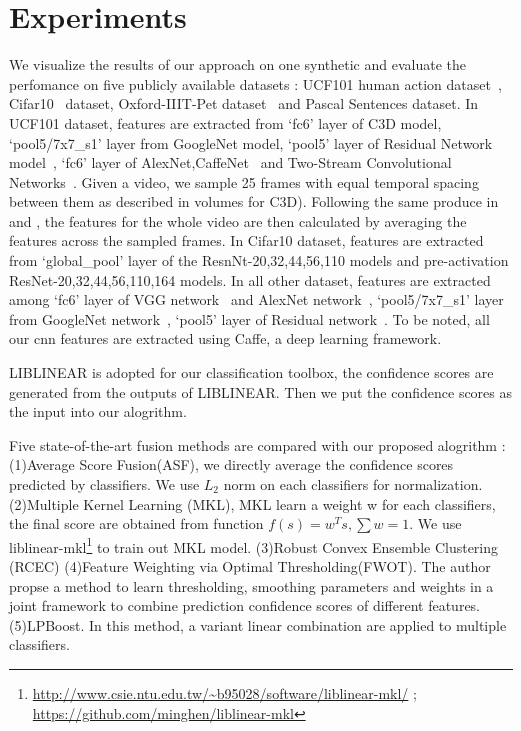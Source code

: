 \documentclass[letterpaper]{article}
\begin{document}
\section{Experiments}
We visualize the results of our approach on one synthetic and evaluate the perfomance on five publicly available datasets : UCF101 human action dataset~\cite{soomro2012ucf101}, Cifar10~\cite{krizhevsky2009learning} dataset, Oxford-IIIT-Pet dataset~\cite{parkhi12a} and Pascal Sentences dataset.
In UCF101 dataset, features are extracted from `fc6' layer of C3D model\cite{tran2015learning}, `pool5/7x7\_s1' layer from GoogleNet model\cite{szegedy2015going}, `pool5' layer of Residual Network model~\cite{he2015deep}, `fc6' layer of AlexNet,CaffeNet~\cite{krizhevsky2012imagenet} and Two-Stream Convolutional Networks~\cite{simonyan2014two}. Given a video, we sample 25 frames with equal temporal spacing between them as described in \cite{simonyan2014two} volumes for C3D). Following the same produce in \cite{tran2015learning} and \cite{simonyan2014two}, the features for the whole video are then calculated by averaging the features across the sampled frames.
In Cifar10 dataset, features are extracted from `global\_pool' layer of the ResnNt-20,32,44,56,110 models\cite{he2015deep} and pre-activation ResNet-20,32,44,56,110,164 models\cite{he2016identity}.
In all other dataset, features are extracted among `fc6' layer of VGG network~\cite{chatfield2014return} and AlexNet network~\cite{krizhevsky2012imagenet}, `pool5/7x7\_s1' layer from GoogleNet network~\cite{szegedy2015going}, `pool5' layer of Residual network~\cite{he2015deep}.
To be noted, all our cnn features are extracted using Caffe\cite{jia2014caffe}, a deep learning framework.

LIBLINEAR\cite{fan2008liblinear} is adopted for our classification toolbox, the confidence scores are generated from the outputs of LIBLINEAR. Then we put the confidence scores as the input into our alogrithm.

Five state-of-the-art fusion methods are compared with our proposed alogrithm : (1)Average Score Fusion(ASF), we directly average the confidence scores predicted by classifiers. We use $L_2$ norm on each classifiers for normalization. (2)Multiple Kernel Learning (MKL),  MKL learn a weight w for each classifiers, the final score are obtained from function $f(s)=w^{T}s, \sum w = 1$. We use liblinear-mkl\footnote{\url{http://www.csie.ntu.edu.tw/~b95028/software/liblinear-mkl/} ; \url{https://github.com/minghen/liblinear-mkl}} to train out MKL model. (3)Robust Convex Ensemble Clustering (RCEC)\cite{gaoijcai2016robust} (4)Feature Weighting via Optimal Thresholding(FWOT)\cite{xuiccv2013feature}. The author propse a method to learn thresholding, smoothing parameters and weights in a joint framework to combine prediction confidence scores of different features. (5)LPBoost\cite{gehler2009feature}. In this method, a variant linear combination are applied to multiple classifiers.
\end{document}
